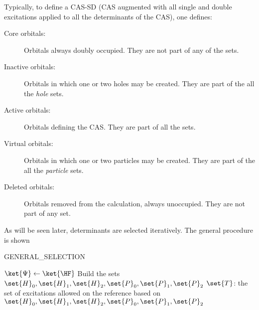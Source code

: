 Typically, to define a CAS-SD (CAS augmented with all single and double excitations applied to all the determinants of the CAS), one defines:
\begin{description}
\item [Core orbitals:]
Orbitals always doubly occupied. They are not part of any of the sets.
\item [Inactive orbitals:]
Orbitals in which one or two holes may be created. They are part of the all the \emph{hole} sets.
\item [Active orbitals:]
Orbitals defining the CAS. They are part of all the sets.
\item [Virtual orbitals:]
Orbitals in which one or two particles may be created. They are part of the all the \emph{particle} sets.
\item [Deleted orbitals:]
Orbitals removed from the calculation, always unoccupied. They are not part of any set.
\end{description}


 As will be seen later, determinants are selected iteratively. The general procedure is shown 



\begin{algorithm}
        \caption{GENERAL\_SELECTION}    
        \label{alg:GENERAL_SELECTION}   
        $\ket{\Psi} \gets \ket{\HF}$\;
        Build the sets $\set{H}_0, \set{H}_1, \set{H}_2, \set{P}_0, \set{P}_1, \set{P}_2$ \;
        $\set{T}$: the set of excitations allowed on the reference based on $\set{H}_0, \set{H}_1, \set{H}_2, \set{P}_0, \set{P}_1, \set{P}_2$ \;
        
\end{algorithm}
